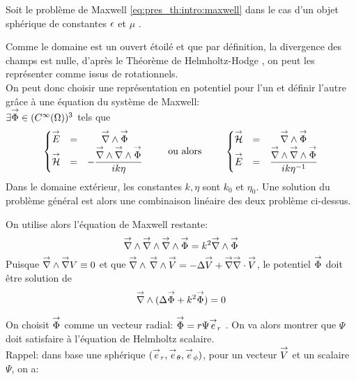 Soit le problème de Maxwell \eqref{eq:pres_th:intro:maxwell} dans le cas d'un objet sphérique de constantes \(\epsilon\) et \(\mu\)%
.

Comme le domaine est un ouvert étoilé et que par définition, la divergence des champs est nulle, d'après le Théorème de Helmholtz-Hodge \cite{gui_rigorous_2007}, on peut les représenter comme issus de rotationnels.\\
On peut donc choisir une représentation en potentiel pour l'un et définir l'autre grâce à une équation du système de Maxwell:\\
 \(\exists {\overset{\rightarrow}{\Phi}} \in (C^\infty(\Omega))^3\) tels que
\begin{equation}
  \label{eq:sol_maxwell:pot_hertz}
  \left\lbrace\begin{matrix}
    \vE &=& \vrot \vect \Phi \\
    \vH &=& - \frac{\vrot \vrot \vect \Phi}{ik\eta}
  \end{matrix} \right.
  \qquad \text{ ou alors } \qquad
  \left\lbrace\begin{matrix}
    \vH &=& \vrot \vect \Phi\\
    \vE &=& \frac{\vrot \vrot \vect \Phi}{ik\eta^{-1}}\\
  \end{matrix}\right.
\end{equation}
Dans le domaine extérieur, les constantes \(k,\eta\) sont \(k_0\) et \(\eta_0\).
Une solution du problème général est alors une combinaison linéaire des deux problème ci-dessus.

On utilise alors l'équation de Maxwell restante:
\[
    {\overset{\rightarrow}{\nabla}}\wedge {\overset{\rightarrow}{\nabla}}\wedge {\overset{\rightarrow}{\nabla}}\wedge {\overset{\rightarrow}{\Phi}} = k^2 {\overset{\rightarrow}{\nabla}}\wedge {\overset{\rightarrow}{\Phi}}
\]
Puisque \({\overset{\rightarrow}{\nabla}}\wedge  {\overset{\rightarrow}{\nabla}}  V  \equiv 0\) et que \({\overset{\rightarrow}{\nabla}}\wedge\, {\overset{\rightarrow}{\nabla}}\wedge {\overset{\rightarrow}{V}} = -\Delta {\overset{\rightarrow}{V}} + {\overset{\rightarrow}{\nabla}} {\overset{\rightarrow}{\nabla}}\cdot {\overset{\rightarrow}{V}}\), le potentiel \({\overset{\rightarrow}{\Phi}}\) doit être solution de 
\begin{equation}
  \label{eq:sol_maxwell:helmholtz_vect}
  \vrot ( \lapl \vect \Phi + k^2 \vect \Phi ) = 0
\end{equation}

On choisit \({\overset{\rightarrow}{\Phi}}\) comme un vecteur radial: \({\overset{\rightarrow}{\Phi}} = r \Psi {\overset{\rightarrow}{e}}_r\) \cite[p.~84]{bohren_absorption_2004}. On va alors montrer que \(\Psi\) doit satisfaire à l'équation de Helmholtz scalaire.\\

Rappel: dans base une sphérique \(({\overset{\rightarrow}{e}}_r, {\overset{\rightarrow}{e}}_\theta, {\overset{\rightarrow}{e}}_\phi)\), pour 
un vecteur \({\overset{\rightarrow}{V}}\) 
et un scalaire \(\Psi\), on a:

